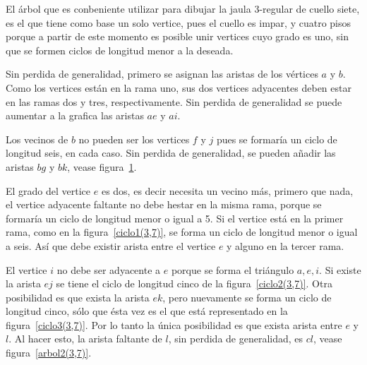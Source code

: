 \documentclass[12pt]{book}
\theoremstyle{definition}
\begin{document}
El árbol que es conbeniente utilizar para dibujar la jaula $3$-regular
de cuello siete, es el que tiene como base un solo vertice, pues el
cuello es impar, y cuatro pisos porque a partir de este momento es
posible unir vertices cuyo grado es uno, sin que se formen ciclos de
longitud menor a la deseada. 


Sin perdida de generalidad, primero se asignan las aristas de los
vértices $a$ y $b$. Como los vertices están en la rama uno, sus dos
vertices adyacentes deben estar en las ramas dos y tres,
respectivamente. Sin perdida de generalidad se puede aumentar a la
grafica las aristas $ae$ y $ai$. 

Los vecinos de $b$ no pueden ser los vertices $f$ y $j$ pues se
formaría un ciclo de longitud seis, en cada caso. Sin perdida de
generalidad, se pueden añadir las aristas $bg$ y $bk$, vease figura~\ref{arbol(3,7)}.

\begin{figure}
  \centering
  \caption{} \label{arbol(3,7)}
\end{figure}

El grado del vertice $e$  es dos, es decir necesita un
vecino más, primero que nada, el vertice adyacente faltante no debe
hestar en la misma rama, porque se formaría un ciclo de longitud
menor o igual a 5. Si el vertice está en la primer rama, como en la
figura~\ref{ciclo1(3,7)}, se forma un ciclo de longitud menor o igual
a seis. Así que debe existir arista entre el vertice $e$ y alguno en
la tercer rama.

El vertice $i$ no debe ser adyacente a $e$ porque se forma el
triángulo $a, e, i$. Si existe la arista $ej$ se
tiene el ciclo de longitud cinco de la figura~\ref{ciclo2(3,7)}. Otra
posibilidad es que exista la arista $ek$, pero nuevamente se forma un
ciclo de longitud cinco, sólo que ésta vez es el que está representado
en la figura~\ref{ciclo3(3,7)}. Por lo tanto la única posibilidad es
que exista arista entre $e$ y $l$. Al hacer esto, la arista faltante de $l$,
sin perdida de generalidad, es $cl$, vease figura~\ref{arbol2(3,7)}.
\end{document}
